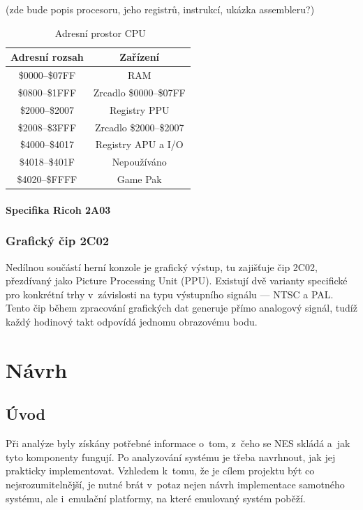 (zde bude popis procesoru, jeho registrů, instrukcí, ukázka assembleru?)

\begin{table}[ht!]
	\centering
	\caption{~Adresní prostor CPU}\label{tab:cpu-adresniprostor}
	\begin{tabular}{|c|c|}
		\hline
		Adresní rozsah & Zařízení \\
		\hline
		\$0000–\$07FF & RAM \\
		\hline
		\$0800–\$1FFF & Zrcadlo \$0000–\$07FF \\
		\hline
		\$2000–\$2007 & Registry PPU \\
		\hline
		\$2008–\$3FFF & Zrcadlo \$2000–\$2007 \\
		\hline
		\$4000–\$4017 & Registry APU a I/O \\
		\hline
		\$4018–\$401F & Nepoužíváno \\
		\hline
		\$4020–\$FFFF & Game Pak \\
		\hline
	\end{tabular}
\end{table}

\subsubsection{Specifika Ricoh 2A03}

\subsection{Grafický čip 2C02}
Nedílnou součástí herní konzole je grafický výstup, tu zajišťuje čip 2C02, přezdívaný jako Picture Processing Unit (PPU). Existují dvě varianty specifické pro konkrétní trhy v~závislosti na typu výstupního signálu --- NTSC a PAL. Tento čip během zpracování grafických dat generuje přímo analogový signál, tudíž každý hodinový takt odpovídá jednomu obrazovému bodu.

\chapter{Návrh}
\section{Úvod}
Při analýze byly získány potřebné informace o~tom, z~čeho se NES skládá a~jak tyto komponenty fungují. Po analyzování systému je třeba navrhnout, jak jej prakticky implementovat. Vzhledem k~tomu, že je cílem projektu být co nejsrozumitelnější, je nutné brát v~potaz nejen návrh implementace samotného systému, ale i~emulační platformy, na které emulovaný systém poběží.

